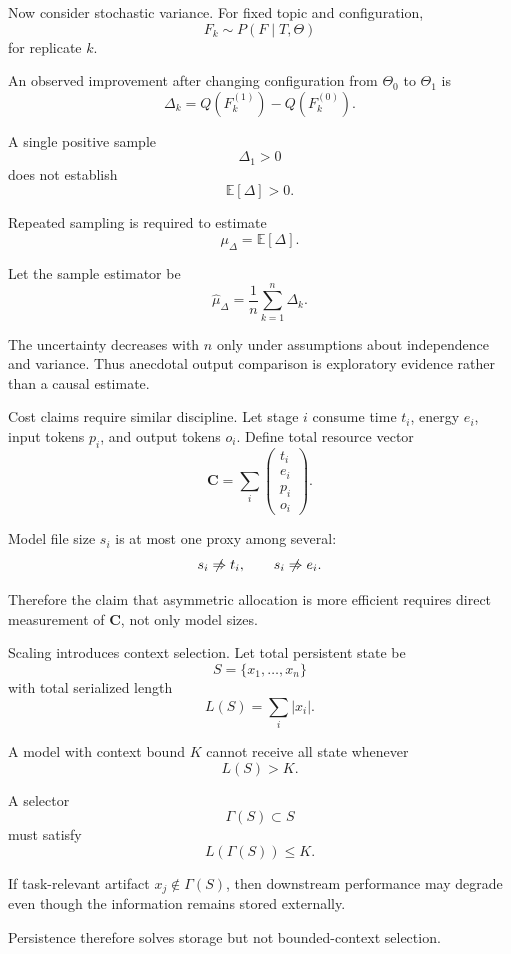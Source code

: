\documentclass[11pt]{article}
\begin{document}
Now consider stochastic variance. For fixed topic and configuration,
\[
    F_k\sim P(F\mid T,\Theta)
\]
for replicate \(k\).

An observed improvement after changing configuration from \(\Theta_0\) to \(\Theta_1\) is
\[
    \Delta_k
    =
    Q(F_k^{(1)})
    -
    Q(F_k^{(0)}).
\]

A single positive sample
\[
    \Delta_1>0
\]
does not establish
\[
    \mathbb{E}[\Delta]>0.
\]

Repeated sampling is required to estimate
\[
    \mu_\Delta
    =
    \mathbb{E}[\Delta].
\]

Let the sample estimator be
\[
    \widehat\mu_\Delta
    =
    \frac{1}{n}
    \sum_{k=1}^{n}\Delta_k.
\]

The uncertainty decreases with \(n\) only under assumptions about independence and variance. Thus anecdotal output comparison is exploratory evidence rather than a causal estimate.

Cost claims require similar discipline. Let stage \(i\) consume time \(t_i\), energy \(e_i\), input tokens \(p_i\), and output tokens \(o_i\). Define total resource vector
\[
    \mathbf{C}
    =
    \sum_i
    \begin{pmatrix}
    t_i\\
    e_i\\
    p_i\\
    o_i
    \end{pmatrix}.
\]

Model file size \(s_i\) is at most one proxy among several:
\[
    s_i
    \centernot\Rightarrow
    t_i,
    \qquad
    s_i
    \centernot\Rightarrow
    e_i.
\]

Therefore the claim that asymmetric allocation is more efficient requires direct measurement of \(\mathbf{C}\), not only model sizes.

Scaling introduces context selection. Let total persistent state be
\[
    S=\{x_1,\ldots,x_n\}
\]
with total serialized length
\[
    L(S)=\sum_i|x_i|.
\]

A model with context bound \(K\) cannot receive all state whenever
\[
    L(S)>K.
\]

A selector
\[
    \Gamma(S)\subset S
\]
must satisfy
\[
    L(\Gamma(S))\leq K.
\]

If task-relevant artifact \(x_j\notin\Gamma(S)\), then downstream performance may degrade even though the information remains stored externally.

Persistence therefore solves storage but not bounded-context selection.
\end{document}
